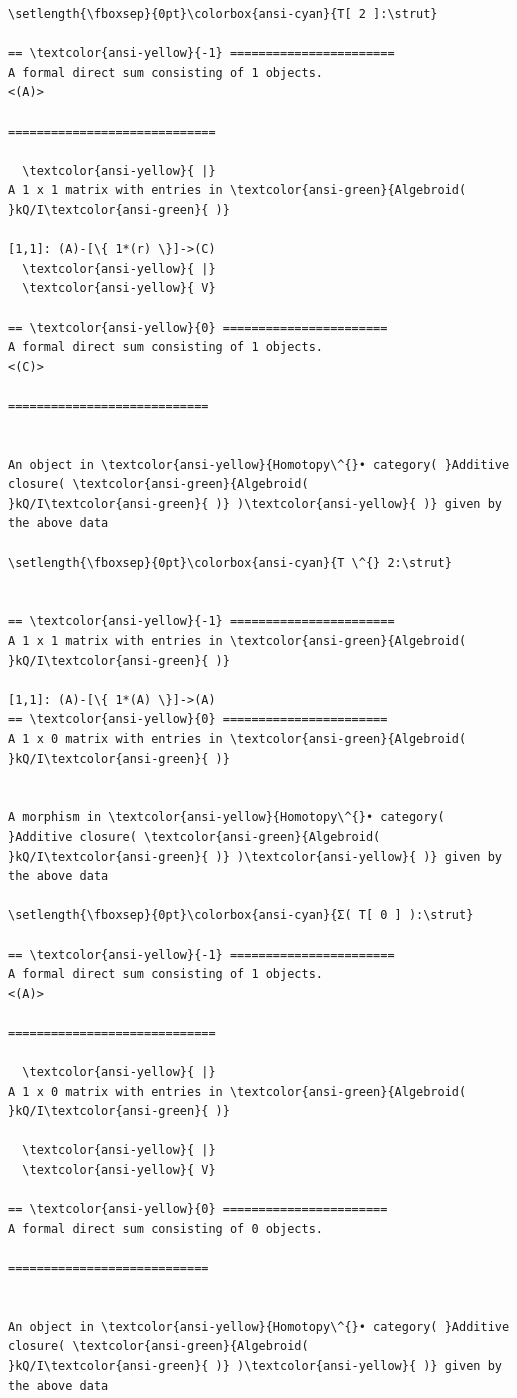 \documentclass[11pt]{article}
\begin{document}
\begin{Verbatim}[commandchars=\\\{\}]
\setlength{\fboxsep}{0pt}\colorbox{ansi-cyan}{T[ 2 ]:\strut}

== \textcolor{ansi-yellow}{-1} =======================
A formal direct sum consisting of 1 objects.
<(A)>

=============================

  \textcolor{ansi-yellow}{ |}
A 1 x 1 matrix with entries in \textcolor{ansi-green}{Algebroid( }kQ/I\textcolor{ansi-green}{ )}

[1,1]: (A)-[\{ 1*(r) \}]->(C)
  \textcolor{ansi-yellow}{ |}
  \textcolor{ansi-yellow}{ V}

== \textcolor{ansi-yellow}{0} =======================
A formal direct sum consisting of 1 objects.
<(C)>

============================


An object in \textcolor{ansi-yellow}{Homotopy\^{}• category( }Additive closure( \textcolor{ansi-green}{Algebroid(
}kQ/I\textcolor{ansi-green}{ )} )\textcolor{ansi-yellow}{ )} given by the above data

\setlength{\fboxsep}{0pt}\colorbox{ansi-cyan}{T \^{} 2:\strut}


== \textcolor{ansi-yellow}{-1} =======================
A 1 x 1 matrix with entries in \textcolor{ansi-green}{Algebroid( }kQ/I\textcolor{ansi-green}{ )}

[1,1]: (A)-[\{ 1*(A) \}]->(A)
== \textcolor{ansi-yellow}{0} =======================
A 1 x 0 matrix with entries in \textcolor{ansi-green}{Algebroid( }kQ/I\textcolor{ansi-green}{ )}


A morphism in \textcolor{ansi-yellow}{Homotopy\^{}• category( }Additive closure( \textcolor{ansi-green}{Algebroid(
}kQ/I\textcolor{ansi-green}{ )} )\textcolor{ansi-yellow}{ )} given by the above data

\setlength{\fboxsep}{0pt}\colorbox{ansi-cyan}{Σ( T[ 0 ] ):\strut}

== \textcolor{ansi-yellow}{-1} =======================
A formal direct sum consisting of 1 objects.
<(A)>

=============================

  \textcolor{ansi-yellow}{ |}
A 1 x 0 matrix with entries in \textcolor{ansi-green}{Algebroid( }kQ/I\textcolor{ansi-green}{ )}

  \textcolor{ansi-yellow}{ |}
  \textcolor{ansi-yellow}{ V}

== \textcolor{ansi-yellow}{0} =======================
A formal direct sum consisting of 0 objects.

============================


An object in \textcolor{ansi-yellow}{Homotopy\^{}• category( }Additive closure( \textcolor{ansi-green}{Algebroid(
}kQ/I\textcolor{ansi-green}{ )} )\textcolor{ansi-yellow}{ )} given by the above data
    \end{Verbatim}
\end{document}
